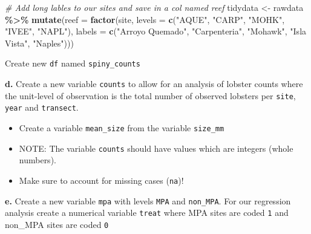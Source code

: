 \documentclass[
]{article}
\newenvironment{Shaded}{\begin{snugshade}}{\end{snugshade}}
\newcommand{\AttributeTok}[1]{\textcolor[rgb]{0.13,0.29,0.53}{#1}}
\newcommand{\CommentTok}[1]{\textcolor[rgb]{0.56,0.35,0.01}{\textit{#1}}}
\newcommand{\FunctionTok}[1]{\textcolor[rgb]{0.13,0.29,0.53}{\textbf{#1}}}
\newcommand{\NormalTok}[1]{#1}
\newcommand{\OtherTok}[1]{\textcolor[rgb]{0.56,0.35,0.01}{#1}}
\newcommand{\SpecialCharTok}[1]{\textcolor[rgb]{0.81,0.36,0.00}{\textbf{#1}}}
\newcommand{\StringTok}[1]{\textcolor[rgb]{0.31,0.60,0.02}{#1}}
\providecommand{\tightlist}{%
  \setlength{\itemsep}{0pt}\setlength{\parskip}{0pt}}
\begin{document}
\begin{Shaded}
\begin{Highlighting}[]
\CommentTok{\# Add long lables to our sites and save in a col named reef}
\NormalTok{tidydata }\OtherTok{\textless{}{-}}\NormalTok{ rawdata }\SpecialCharTok{\%\textgreater{}\%} 
    \FunctionTok{mutate}\NormalTok{(}\AttributeTok{reef =} \FunctionTok{factor}\NormalTok{(site, }
                         \AttributeTok{levels =} \FunctionTok{c}\NormalTok{(}\StringTok{"AQUE"}\NormalTok{, }\StringTok{"CARP"}\NormalTok{, }\StringTok{"MOHK"}\NormalTok{,     }\StringTok{"IVEE"}\NormalTok{, }\StringTok{"NAPL"}\NormalTok{), }
                         \AttributeTok{labels =} \FunctionTok{c}\NormalTok{(}\StringTok{"Arroyo Quemado"}\NormalTok{, }\StringTok{"Carpenteria"}\NormalTok{, }\StringTok{"Mohawk"}\NormalTok{, }
                                    \StringTok{"Isla Vista"}\NormalTok{,  }\StringTok{"Naples"}\NormalTok{)))}
\end{Highlighting}
\end{Shaded}

Create new \texttt{df} named \texttt{spiny\_counts}

\textbf{d.} Create a new variable \texttt{counts} to allow for an
analysis of lobster counts where the unit-level of observation is the
total number of observed lobsters per \texttt{site}, \texttt{year} and
\texttt{transect}.

\begin{itemize}
\tightlist
\item
  Create a variable \texttt{mean\_size} from the variable
  \texttt{size\_mm}
\item
  NOTE: The variable \texttt{counts} should have values which are
  integers (whole numbers).
\item
  Make sure to account for missing cases (\texttt{na})!
\end{itemize}

\textbf{e.} Create a new variable \texttt{mpa} with levels \texttt{MPA}
and \texttt{non\_MPA}. For our regression analysis create a numerical
variable \texttt{treat} where MPA sites are coded \texttt{1} and
non\_MPA sites are coded \texttt{0}
\end{document}
